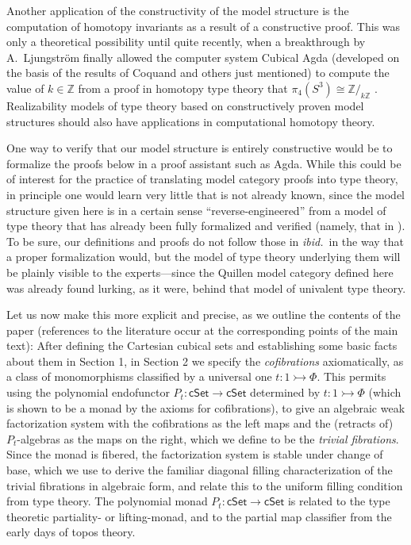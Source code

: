 \documentclass[11pt]{amsart}
\newcommand{\ibid}{\emph{ibid.}}
\newcommand{\Z}{\ensuremath{\mathbb{Z}}}
\newcommand{\cSet}{\ensuremath{\mathsf{cSet}}}
\newcommand{\cof}{\ensuremath{\rightarrowtail}}
\renewcommand{\to}{\ensuremath{\rightarrow}}
\theoremstyle{remark}
\theoremstyle{definition}
\begin{document}
Another application of the constructivity of the model structure is the computation of homotopy invariants as a result of a constructive proof.  This was only a theoretical possibility until quite recently, when a breakthrough by A.~Ljungstr\"om finally allowed the computer system Cubical Agda (developed on the basis of the results of Coquand and others just mentioned) to compute the value of $k\in \Z$ from a proof in homotopy type theory that $\pi_4(S^3)\cong \Z/_{k\Z}$ \cite{M}.  Realizability models of type theory based on constructively proven model structures should also have applications in computational homotopy theory.

One way to verify that our model structure is entirely constructive would be to formalize the proofs below in a proof assistant such as Agda.  While this could be of interest for the practice of translating model category proofs into type theory, in principle one would learn very little that is not already known, since the model structure given here is in a certain sense ``reverse-engineered'' from a model of type theory that has already been fully formalized and verified (namely, that in \cite{ABC}).  To be sure, our definitions and proofs do not follow those in \ibid\ in the way that a proper formalization would, but the model of type theory underlying them will be plainly visible to the experts---since the Quillen model category defined here was already found lurking, as it were, behind that model of univalent type theory.

Let us now make this more explicit and precise, as we outline the contents of the paper (references to the literature occur at the corresponding points of the main text):
After defining the Cartesian cubical sets and establishing some basic facts about them in Section 1, in Section 2 we specify the \emph{cofibrations} axiomatically, as a class of monomorphisms classified by a universal one $t:1 \cof \Phi$.  This permits using the polynomial endofunctor $P_t : \cSet\to \cSet$ determined by $t:1 \cof \Phi$ (which is shown to be a monad by the axioms for cofibrations), to give an algebraic weak factorization system with the cofibrations as the left maps and the (retracts of) $P_t$-algebras as the maps on the right, which we define to be the \emph{trivial fibrations}.  Since the monad is fibered, the factorization system is stable under change of base, which we use to derive the familiar diagonal filling characterization of the trivial fibrations in algebraic form, and relate this to the uniform filling condition from type theory.  The polynomial monad $P_t : \cSet\to \cSet$ is related to the type theoretic partiality- or lifting-monad, and to the partial map classifier from the early days of topos theory.
\end{document}
